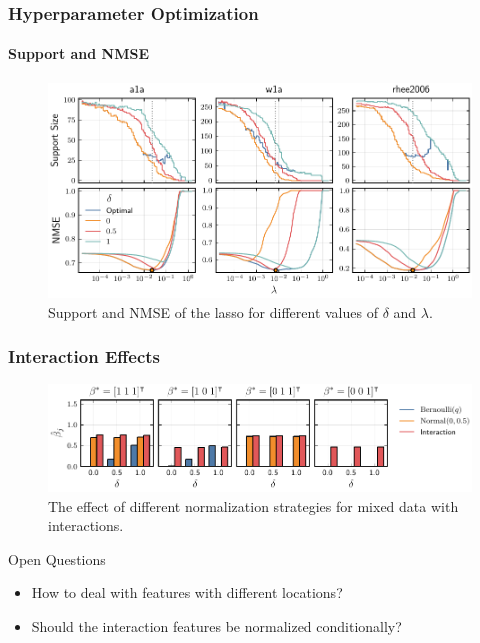 \documentclass[10pt]{beamer}
\begin{document}
\begin{frame}[c]
  \frametitle{Hyperparameter Optimization}
  \framesubtitle{Support and NMSE}

  \begin{figure}[htpb]
    \centering
    \includegraphics[width=\textwidth]{figures/hyperopt_paths.pdf}
    \caption{%
      Support and NMSE of the lasso for different values of \(\delta\) and \(\lambda\).
    }
  \end{figure}
\end{frame}

\begin{frame}[c]
  \frametitle{Interaction Effects}

  \begin{figure}[htpb]
    \centering
    \includegraphics[width=\textwidth]{figures/interactions.pdf}
    \caption{%
      The effect of different normalization strategies for mixed data with interactions.
    }
  \end{figure}

  \pause

  \begin{exampleblock}{Open Questions}
    \begin{itemize}
      \item How to deal with features with different locations?
      \item Should the interaction features be normalized conditionally?
    \end{itemize}
  \end{exampleblock}
\end{frame}
\end{document}
